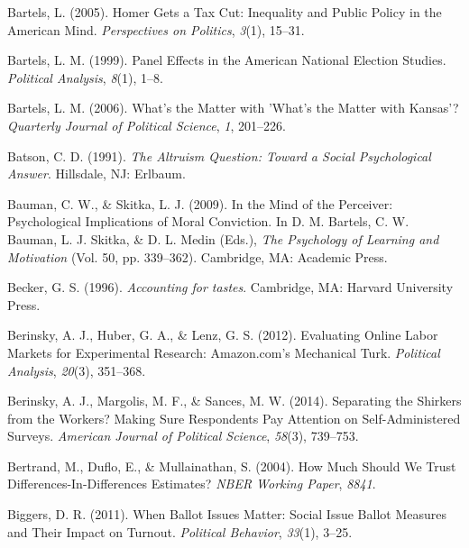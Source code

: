 \documentclass[12pt,econ]{sources/authesis}
\newenvironment{CSLReferences}%
  {}%
  {\par}
\begin{document}
\begin{CSLReferences}{1}{0}
\leavevmode{}%
Bartels, L. (2005). {Homer Gets a Tax Cut: Inequality and Public Policy in the American Mind}. \emph{Perspectives on Politics}, \emph{3}(1), 15--31.

\leavevmode{}%
Bartels, L. M. (1999). {Panel Effects in the American National Election Studies}. \emph{Political Analysis}, \emph{8}(1), 1--8.

\leavevmode{}%
Bartels, L. M. (2006). {What's the Matter with 'What's the Matter with Kansas'?} \emph{Quarterly Journal of Political Science}, \emph{1}, 201--226.

\leavevmode{}%
Batson, C. D. (1991). \emph{The {Altruism} {Question}: {Toward} a {Social} {Psychological} {Answer}}. Hillsdale, NJ: Erlbaum.

\leavevmode{}%
Bauman, C. W., \& Skitka, L. J. (2009). {In the Mind of the Perceiver: Psychological Implications of Moral Conviction}. In D. M. Bartels, C. W. Bauman, L. J. Skitka, \& D. L. Medin (Eds.), \emph{{The Psychology of Learning and Motivation}} (Vol. 50, pp. 339--362). Cambridge, MA: Academic Press.

\leavevmode{}%
Becker, G. S. (1996). \emph{{Accounting for tastes}}. Cambridge, MA: Harvard University Press.

\leavevmode{}%
Berinsky, A. J., Huber, G. A., \& Lenz, G. S. (2012). Evaluating {Online} {Labor} {Markets} for {Experimental} {Research}: {Amazon}.com's {Mechanical} {Turk}. \emph{Political Analysis}, \emph{20}(3), 351--368.

\leavevmode{}%
Berinsky, A. J., Margolis, M. F., \& Sances, M. W. (2014). {Separating the Shirkers from the Workers? Making Sure Respondents Pay Attention on Self-Administered Surveys}. \emph{American Journal of Political Science}, \emph{58}(3), 739--753.

\leavevmode{}%
Bertrand, M., Duflo, E., \& Mullainathan, S. (2004). {How Much Should We Trust Differences-In-Differences Estimates?} \emph{NBER Working Paper}, \emph{8841}.

\leavevmode{}%
Biggers, D. R. (2011). {When Ballot Issues Matter: Social Issue Ballot Measures and Their Impact on Turnout}. \emph{Political Behavior}, \emph{33}(1), 3--25.


\end{CSLReferences}
\end{document}
